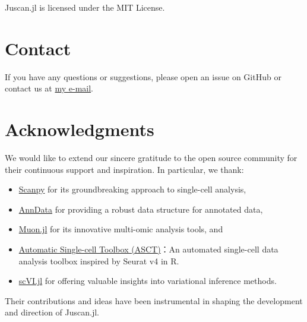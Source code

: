 \documentclass[oneside]{memoir}
\begin{document}
\label{2455754727547577773}{}


Juscan.jl is licensed under the MIT License.



\section{Contact}



\label{15110382712247013745}{}


If you have any questions or suggestions, please open an issue on GitHub or contact us at \href{mailto:zehuali0417@gmail.com}{my e-mail}.



\section{Acknowledgments}



\label{6467028106495259876}{}


We would like to extend our sincere gratitude to the open source community for their continuous support and inspiration. In particular, we thank:



\begin{itemize}
\item \href{https://github.com/theislab/scanpy}{Scanpy} for its groundbreaking approach to single-cell analysis,


\item \href{https://github.com/theislab/anndata}{AnnData} for providing a robust data structure for annotated data,


\item \href{https://github.com/scverse/Muon.jl.git}{Muon.jl} for its innovative multi-omic analysis tools, and


\item \href{https://github.com/kaji331/ASCT}{Automatic Single-cell Toolbox (ASCT)}：An automated single-cell data analysis toolbox inspired by Seurat v4 in R.


\item \href{https://github.com/maren-ha/scVI.jl.git}{scVI.jl} for offering valuable insights into variational inference methods.

\end{itemize}


Their contributions and ideas have been instrumental in shaping the development and direction of Juscan.jl.
\end{document}
